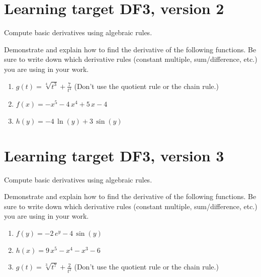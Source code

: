 \pagebreak

\section{Learning target DF3, version 2}

Compute basic derivatives using algebraic rules.

\hrulefill

Demonstrate and explain how to find the derivative of the following functions. Be sure to write down which derivative rules (constant multiple, sum/difference, etc.) you are using in your work.

\begin{enumerate}
    \item \(g(t) = \sqrt[4]{t^3} + \frac{7}{t^{4}}\) \quad (Don't use the quotient rule or the chain rule.)
    \vfill
    \item \(f(x) = -x^{5} - 4 \, x^{4} + 5 \, x - 4\)
    \vfill
    \item \(h(y) = -4 \, \ln\left(y\right) + 3 \, \sin\left(y\right)\)
    \vfill
\end{enumerate}

\pagebreak

\section{Learning target DF3, version 3}

Compute basic derivatives using algebraic rules.

\hrulefill

Demonstrate and explain how to find the derivative of the following functions. Be sure to write down which derivative rules (constant multiple, sum/difference, etc.) you are using in your work.

\begin{enumerate}
    \item \(f(y) = -2 \, e^{y} - 4 \, \sin\left(y\right)\) 
    \vfill
    \item \(h(x) = 9 \, x^{5} - x^{4} - x^{3} - 6\) 
    \vfill
    \item \(g(t) = \sqrt[3]{t^7} + \frac{2}{t^{2}}\)  \quad (Don't use the quotient rule or the chain rule.)
    \vfill
\end{enumerate}

